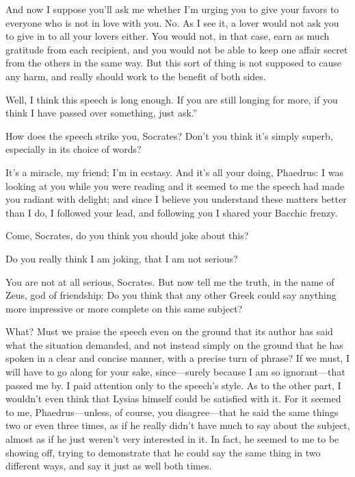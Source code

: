 And now I suppose you'll ask me whether I'm urging you to give your
favors to everyone who is not in love with you. No. As I see it, a lover
would not ask you to give in to all your lovers either. You would not,
in that case, earn as much gratitude from each recipient, and
you would not be able to keep one affair secret from the others in the
same way. But this sort of thing is not supposed to cause any harm, and
really should work to the benefit of both sides.

Well, I think this speech is long enough. If you are still longing for
more, if you think I have passed over something, just ask.”

How does the speech strike you, Socrates? Don't you think it's simply
superb, especially in its choice of words?

\saysocrates It's a miracle, my friend; I'm in ecstasy. And it's all your 
doing, Phaedrus: I was looking at you while you were reading and
it seemed to me the speech had made you radiant with delight; and since
I believe you understand these matters better than I do, I followed your
lead, and following you I shared your Bacchic frenzy.

\sayphaedrus Come, Socrates, do you think you should joke about this?

\saysocrates Do you really think I am joking, that I am not serious?

\sayphaedrus You are not at all serious, Socrates. But now tell me
the truth, in the name of Zeus, god of friendship: Do you think that any
other Greek could say anything more impressive or more complete on this
same subject?

\saysocrates What? Must we praise the speech even on the ground that its
author has said what the situation demanded, and not instead simply on
the ground that he has spoken in a clear and concise manner, with a
precise turn of phrase? If we must, I will have to go along for your
sake, since---surely because I am so ignorant---that
passed me by. I paid attention only to the speech's style. As to the
other part, I wouldn't even think that Lysias himself could be satisfied
with it. For it seemed to me, Phaedrus---unless, of course, you
disagree---that he said the same things two or even three times, as if
he really didn't have much to say about the subject, almost as if he
just weren't very interested in it. In fact, he seemed to me to be
showing off, trying to demonstrate that he could say the same thing in
two different ways, and say it just as well both times.


